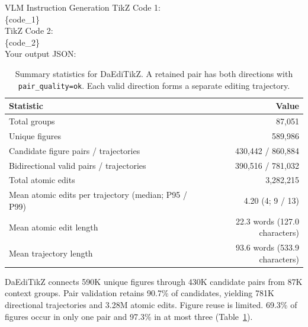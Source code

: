\begin{PromptBox}{VLM Instruction Generation}
TikZ Code 1: \\
\{code\_1\} \\

TikZ Code 2: \\
\{code\_2\} \\

Your output JSON:
\label{fig:prompt_edit_instructions}
\end{PromptBox}

\clearpage

\begin{table}[t]
\centering
\caption{Summary statistics for DaEdiTikZ. A retained pair has both directions with \texttt{pair\_quality=ok}. Each valid direction forms a separate editing trajectory.}
\label{tab:daeditikz_summary}
\setlength{\tabcolsep}{8pt}
\renewcommand{\arraystretch}{0.98}
\begin{tabular}{lr}
\toprule
\textbf{Statistic} & \textbf{Value} \\
\midrule
Total groups & 87,051 \\
Unique figures & 589,986 \\
Candidate figure pairs / trajectories & 430,442 / 860,884 \\
Bidirectional valid pairs / trajectories & 390,516 / 781,032 \\
Total atomic edits & 3,282,215 \\
Mean atomic edits per trajectory (median; P95 / P99) & 4.20 (4; 9 / 13) \\
Mean atomic edit length & 22.3 words (127.0 characters) \\
Mean trajectory length & 93.6 words (533.9 characters) \\
\bottomrule
\end{tabular}
\end{table}
DaEdiTikZ connects 590K unique figures through 430K candidate pairs from 87K context groups. Pair validation retains 90.7\% of candidates, yielding 781K directional trajectories and 3.28M atomic edits. Figure reuse is limited. 69.3\% of figures occur in only one pair and 97.3\% in at most three (Table~\ref{tab:daeditikz_summary}).

